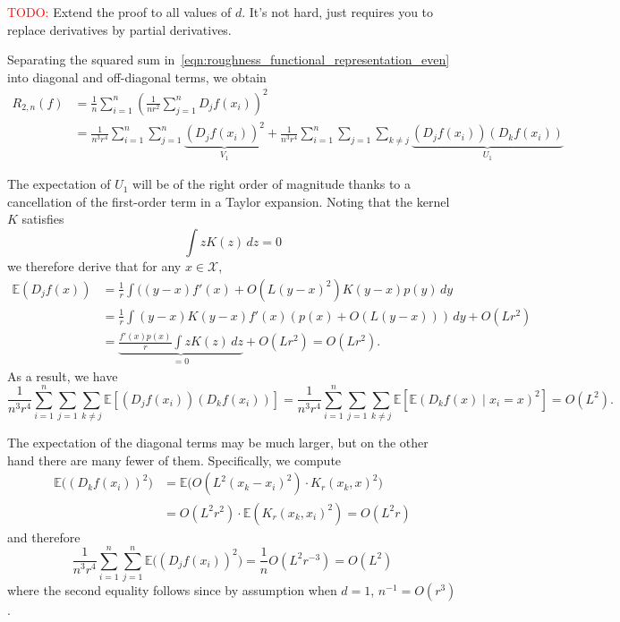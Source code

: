\documentclass{article}
\newcommand{\1}{\mathbf{1}}
\newcommand{\Ebb}{\mathbb{E}}
\theoremstyle{alden}
\theoremstyle{aldenthm}
\theoremstyle{definition}
\theoremstyle{remark}
\begin{document}
\textcolor{red}{TODO:} Extend the proof to all values of $d$. It's not hard, just requires you to replace derivatives by partial derivatives.

Separating the squared sum in~\eqref{eqn:roughness_functional_representation_even} into diagonal and off-diagonal terms, we obtain
\begin{align*}
R_{2,n}(f) & = \frac{1}{n}\sum_{i = 1}^{n}\left(\frac{1}{nr^2}\sum_{j = 1}^{n} D_jf(x_i)\right)^2 \\
& = \frac{1}{n^3r^4}\sum_{i = 1}^{n} \sum_{j = 1}^{n}\underbrace{(D_jf(x_i))^2}_{V_1} + \frac{1}{n^3r^4}\sum_{i = 1}^{n} \sum_{j = 1} \sum_{k \neq j}\underbrace{(D_jf(x_i))(D_kf(x_i))}_{U_1}
\end{align*}

The expectation of $U_1$ will be of the right order of magnitude thanks to a cancellation of the first-order term in a Taylor expansion. Noting that the kernel $K$ satisfies
\begin{equation*}
\int z K(z) \,dz = 0
\end{equation*}
we therefore derive that for any $x \in \mathcal{X}$,
\begin{align*}
\mathbb{E}(D_jf(x)) & = \frac{1}{r}\int ((y - x)f'(x) + O(L(y-x)^2) K(y - x) p(y) \,dy \tag{by $f \in C^2(L)$} \\
& = \frac{1}{r}\int(y - x)K(y - x)f'(x)(p(x) + O(L(y - x))) \,dy + O(Lr^2)  \tag{by $p \in C^1(L)$}\\
& = \underbrace{\frac{f'(x) p(x)}{r} \int z K(z) \,dz}_{= 0} + O(Lr^2) = O(Lr^2).
\end{align*}
As a result, we have
\begin{equation*}
\frac{1}{n^3r^4}\sum_{i = 1}^{n} \sum_{j = 1} \sum_{k \neq j} \Ebb\left[(D_jf(x_i))(D_kf(x_i))\right] = \frac{1}{n^3r^4}\sum_{i = 1}^{n} \sum_{j = 1} \sum_{k \neq j} \Ebb\left[ \Ebb(D_kf(x)\mid x_i = x)^2\right] = O(L^2).
\end{equation*}

The expectation of the diagonal terms may be much larger, but on the other hand there are many fewer of them. Specifically, we compute
\begin{align*}
\Ebb\bigl((D_kf(x_i))^2\bigr) & = \Ebb\biggl(O\left(L^2(x_k - x_i)^2\right)\cdot K_r(x_k,x)^2\biggr) \\
& = O(L^2r^2)\cdot\Ebb(K_r(x_k,x_i)^2) = O(L^2 r)
\end{align*}
and therefore
\begin{equation*}
\frac{1}{n^3r^4}\sum_{i = 1}^{n} \sum_{j = 1}^{n} \Ebb\bigl((D_jf(x_i))^2\bigr) = \frac{1}{n} O(L^2 r^{-3}) = O(L^2)
\end{equation*}
where the second equality follows since by assumption when $d = 1$, $n^{-1} = O(r^{3})$. 
\end{document}
